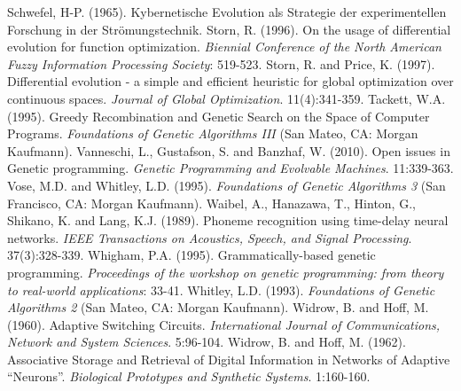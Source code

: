 \documentclass[spanish,a4paper,12pt,twoside]{report}
\begin{document}
\begin{thebibliography}{00}
   Schwefel, H-P. (1965). Kybernetische Evolution als Strategie der experimentellen Forschung in der Strömungstechnik.
   Storn, R. (1996). On the usage of differential evolution for function optimization. \emph{Biennial Conference of the North American Fuzzy Information Processing Society}: 519-523.
   Storn, R. and Price, K. (1997). Differential evolution - a simple and efficient heuristic for global optimization over continuous spaces. \emph{Journal of Global Optimization}. 11(4):341-359.
   Tackett, W.A. (1995). Greedy Recombination and Genetic Search on the Space of Computer Programs. \emph{Foundations of Genetic Algorithms III} (San Mateo, CA: Morgan Kaufmann).
   Vanneschi, L., Gustafson, S. and Banzhaf, W. (2010). Open issues in Genetic programming. \emph{Genetic Programming and Evolvable Machines}. 11:339-363.
   Vose, M.D. and Whitley, L.D. (1995). \emph{Foundations of Genetic Algorithms 3} (San Francisco, CA: Morgan Kaufmann).
   Waibel, A., Hanazawa, T., Hinton, G., Shikano, K. and Lang, K.J. (1989). Phoneme recognition using time-delay neural networks. \emph{IEEE Transactions on Acoustics, Speech, and Signal Processing}. 37(3):328-339.
   Whigham, P.A. (1995). Grammatically-based genetic programming. \emph{Proceedings of the workshop on genetic programming: from theory to real-world applications}: 33-41.
   Whitley, L.D. (1993). \emph{Foundations of Genetic Algorithms 2} (San Mateo, CA: Morgan Kaufmann).
   Widrow, B. and Hoff, M. (1960). Adaptive Switching Circuits. \emph{International Journal of Communications, Network and System Sciences}. 5:96-104.
   Widrow, B. and Hoff, M. (1962). Associative Storage and Retrieval of Digital Information in Networks of Adaptive “Neurons”. \emph{Biological Prototypes and Synthetic Systems}. 1:160-160.
  \end{thebibliography}
  
\end{document}

